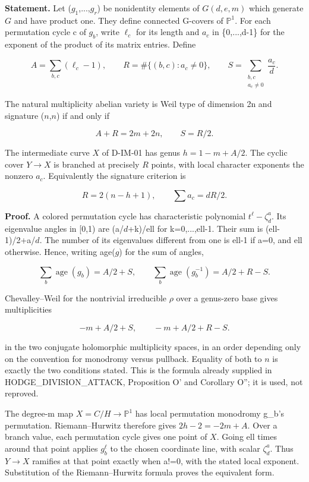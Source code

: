 \textbf{Statement.} Let (\(g_1\),...,\(g_r\)) be nonidentity elements of \(G(d,e,m)\) which generate \(G\) and have product one. They define connected G-covers of \(\mathbb P^1\). For each permutation cycle c of \(g_b\), write \(\ell_c\) for its length and \(a_c\) in \{0,...,d-1\} for the exponent of the product of its matrix entries. Define

\[
A=\sum_{b,c}(\ell_c-1),\qquad R=\#\{(b,c):a_c\ne0\},\qquad S=\sum_{\substack{b,c\\a_c\ne0}}\frac{a_c}{d}.
\]

The natural multiplicity abelian variety is Weil type of dimension 2n and signature (\(n\),\(n\)) if and only if

\[
A+R=2m+2n,\qquad S=R/2.
\]

The intermediate curve \(X\) of D-IM-01 has genus \(h=1-m+A/2\). The cyclic cover \(Y\to X\) is branched at precisely \(R\) points, with local character exponents the nonzero \(a_c\). Equivalently the signature criterion is

\[
R=2(n-h+1),\qquad\sum a_c=dR/2.
\]

\textbf{Proof.} A colored permutation cycle has characteristic polynomial \(t^\ell-\zeta_d^a\). Its eigenvalue angles in [0,1) are (a/\(d\)+k)/ell for k=0,...,ell-1. Their sum is (ell-1)/2+a/\(d\). The number of its eigenvalues different from one is ell-1 if a=0, and ell otherwise. Hence, writing age(\(g\)) for the sum of angles,

\[
\sum_b\operatorname{age}(g_b)=A/2+S,\qquad\sum_b\operatorname{age}(g_b^{-1})=A/2+R-S.
\]

Chevalley--Weil for the nontrivial irreducible \(\rho\) over a genus-zero base gives multiplicities

\[
-m+A/2+S,\qquad-m+A/2+R-S.
\]

in the two conjugate holomorphic multiplicity spaces, in an order depending only on the convention for monodromy versus pullback. Equality of both to \(n\) is exactly the two conditions stated. This is the formula already supplied in HODGE\_DIVISION\_ATTACK, Proposition O' and Corollary O''; it is used, not reproved.

The degree-m map \(X=C/H\to\mathbb P^1\) has local permutation monodromy g\_b's permutation. Riemann--Hurwitz therefore gives \(2h-2=-2m+A\). Over a branch value, each permutation cycle gives one point of \(X\). Going ell times around that point applies \(g_b^\ell\) to the chosen coordinate line, with scalar \(\zeta_d^a\). Thus \(Y\to X\) ramifies at that point exactly when a!=0, with the stated local exponent. Substitution of the Riemann--Hurwitz formula proves the equivalent form.

